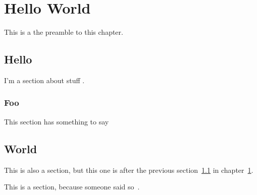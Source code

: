 \chapter{Hello World}\label{sec:hello-world}

This is a the preamble to this chapter.

\section{Hello}\label{sec:hello}

I'm a section about stuff \cite{dummy:1}.

\subsection{Foo}

This section has something to say~\cite{johndoe2014}

\section{World}

This is also a section, but this one is after the previous section~\ref{sec:hello} in chapter~\ref{sec:hello-world}.

This is a section, because someone said so~\cite{rubow2000a}.
